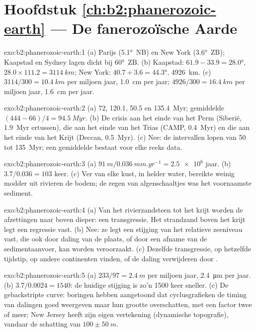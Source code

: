 \section*{Hoofdstuk \ref{ch:b2:phanerozoic-earth} --- De fanerozoïsche Aarde}

\begin{solution}{exo:b2:phanerozoic-earth:1}
(a) Parijs (\ang{5.1}~NB) en New York (\ang{3.6}~ZB); Kaapstad en Sydney lagen dicht bij \ang{60}~ZB.
(b) Kaapstad: $61.9 - 33.9 = \ang{28.0}$, $28.0 \times 111.2 = \qty{3114}{km}$; New York:
$40.7 + 3.6 = \ang{44.3}$, \qty{4926}{km}. (c) $3114/300 = \qty{10.4}{km}$ per miljoen jaar,
\qty{1.0}{cm} per jaar; $4926/300 = \qty{16.4}{km}$ per miljoen jaar, \qty{1.6}{cm} per jaar.
\end{solution}

\begin{solution}{exo:b2:phanerozoic-earth:2}
(a) 72, 120.1, 50.5 en \qty{135.4}{Myr}; gemiddelde $(444 - 66)/4 = \qty{94.5}{Myr}$. (b) De
crisis aan het einde van het Perm (Siberië, \qty{1.9}{Myr} ertussen), die aan het einde van het Trias (CAMP, \qty{0.4}{Myr}) en die aan het
einde van het Krijt (Deccan, \qty{0.5}{Myr}). (c) Nee: de intervallen lopen van 50 tot
\qty{135}{Myr}; een gemiddelde bestaat voor elke reeks data.
\end{solution}

\begin{solution}{exo:b2:phanerozoic-earth:3}
(a) $\qty{91}{m}/\qty{0.036}{mm.yr^{-1}} = \num{2.5e6}$ jaar. (b) $3.7/0.036 = 103$ keer. (c)
Ver van elke kust, in helder water, bereikte weinig modder uit rivieren de bodem; de regen van
algenschaaltjes was het voornaamste sediment.
\end{solution}

\begin{solution}{exo:b2:phanerozoic-earth:4}
(a) Van het rivierzandsteen tot het krijt worden de afzettingen naar boven dieper: een transgressie. Het
strandzand boven het krijt legt een regressie vast. (b) Nee: ze legt een stijging van het relatieve zeeniveau vast,
die ook door daling van de plaats, of door een afname van de sedimentaanvoer, kan worden veroorzaakt. (c)
Dezelfde transgressie, op hetzelfde tijdstip, op andere continenten vinden, of de
daling verwijderen door .
\end{solution}

\begin{solution}{exo:b2:phanerozoic-earth:5}
(a) $233/97 = \qty{2.4}{m}$ per miljoen jaar, \qty{2.4}{\micro m} per jaar. (b) $3.7/0.0024 =
1540$: de huidige stijging is zo'n 1500 keer sneller. (c) De gebackstripte curve: boringen hebben aangetoond
dat cyclusgrafieken de timing van dalingen goed weergeven maar hun grootte overschatten, met een factor twee of
meer; New Jersey heeft zijn eigen vertekening (dynamische topografie), vandaar de schatting van $100 \pm
\qty{50}{m}$.
\end{solution}

